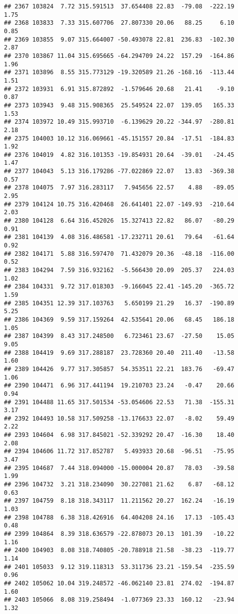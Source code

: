 \documentclass[]{article}
\begin{document}
\begin{verbatim}
## 2367 103824  7.72 315.591513  37.654408 22.83  -79.08  -222.19  1.75
## 2368 103833  7.33 315.607706  27.807330 20.06   88.25     6.10  0.85
## 2369 103855  9.07 315.664007 -50.493078 22.81  236.83  -102.30  2.87
## 2370 103867 11.04 315.695665 -64.294709 24.22  157.29  -164.86  1.96
## 2371 103896  8.55 315.773129 -19.320589 21.26 -168.16  -113.44  1.51
## 2372 103931  6.91 315.872892  -1.579646 20.68   21.41    -9.10  0.87
## 2373 103943  9.48 315.908365  25.549524 22.07  139.05   165.33  1.53
## 2374 103972 10.49 315.993710  -6.139629 20.22 -344.97  -280.81  2.18
## 2375 104003 10.12 316.069661 -45.151557 20.84  -17.51  -184.83  1.92
## 2376 104019  4.82 316.101353 -19.854931 20.64  -39.01   -24.45  1.47
## 2377 104043  5.13 316.179286 -77.022869 22.07   13.83  -369.38  0.57
## 2378 104075  7.97 316.283117   7.945656 22.57    4.88   -89.05  2.95
## 2379 104124 10.75 316.420468  26.641401 22.07 -149.93  -210.64  2.03
## 2380 104128  6.64 316.452026  15.327413 22.82   86.07   -80.29  0.91
## 2381 104139  4.08 316.486581 -17.232711 20.61   79.64   -61.64  0.92
## 2382 104171  5.88 316.597470  71.432079 20.36  -48.18  -116.00  0.52
## 2383 104294  7.59 316.932162  -5.566430 20.09  205.37   224.03  1.02
## 2384 104331  9.72 317.018303  -9.166045 22.41 -145.20  -365.72  1.59
## 2385 104351 12.39 317.103763   5.650199 21.29   16.37  -190.89  5.25
## 2386 104369  9.59 317.159264  42.535641 20.06   68.45   186.18  1.05
## 2387 104399  8.43 317.248500   6.723461 23.67  -27.50    15.05  9.05
## 2388 104419  9.69 317.288187  23.728360 20.40  211.40   -13.58  1.60
## 2389 104426  9.77 317.305857  54.353511 22.21  183.76   -69.47  1.06
## 2390 104471  6.96 317.441194  19.210703 23.24   -0.47    20.66  0.94
## 2391 104488 11.65 317.501534 -53.054606 22.53   71.38  -155.31  3.17
## 2392 104493 10.58 317.509258 -13.176633 22.07   -8.02    59.49  2.22
## 2393 104604  6.98 317.845021 -52.339292 20.47  -16.30    18.40  2.08
## 2394 104606 11.72 317.852787   5.493933 20.68  -96.51   -75.95  3.47
## 2395 104687  7.44 318.094000 -15.000004 20.87   78.03   -39.58  1.99
## 2396 104732  3.21 318.234090  30.227081 21.62    6.87   -68.12  0.63
## 2397 104759  8.18 318.343117  11.211562 20.27  162.24   -16.19  1.03
## 2398 104788  6.38 318.426916  64.404208 24.16   17.13  -105.43  0.48
## 2399 104864  8.39 318.636579 -22.878073 20.13  101.39   -10.22  1.16
## 2400 104903  8.08 318.740805 -20.788918 21.58  -38.23  -119.77  1.14
## 2401 105033  9.12 319.118313  53.311736 23.21 -159.54  -235.59  0.96
## 2402 105062 10.04 319.248572 -46.062140 23.81  274.02  -194.87  1.60
## 2403 105066  8.08 319.258494  -1.077369 23.33  160.12   -23.94  1.32

\end{verbatim}
\end{document}
